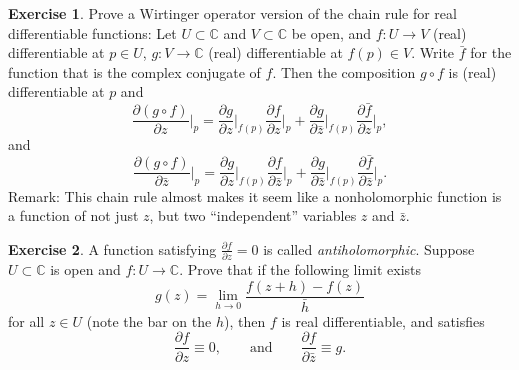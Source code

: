 \documentclass[12pt,openany]{book}
\newcommand{\C}{{\mathbb{C}}}
\newcommand{\myindex}[1]{#1\index{#1}}
\newcommand{\myquote}[1]{``#1''}
\theoremstyle{plain}
\theoremstyle{remark}
\theoremstyle{definition}
\newenvironment{exbox}{%
    \def\FrameCommand{\vrule width 1pt \relax\hspace{10pt}}%
    \MakeFramed{\advance\hsize-\width\FrameRestore}%
}{%
    \endMakeFramed
}
\theoremstyle{exercise}
\newtheorem{exercise}{Exercise}[section]
\theoremstyle{example}
\begin{document}
\begin{exbox}
\begin{exercise}%
\label{exercise:wirtingerchain}
Prove a Wirtinger operator version of
the chain rule
for real differentiable
functions:  Let $U \subset \C$ and $V \subset \C$ be open, and $f \colon U \to V$
(real) differentiable at $p \in U$, $g \colon V \to \C$ (real) differentiable
at $f(p) \in V$.  Write $\bar{f}$ for the function that is the complex conjugate
of $f$.  Then the composition $g \circ f$
is (real) differentiable at $p$ and
\begin{equation*}
\frac{\partial (g \circ f)}{\partial z}\Big|_p
=
\frac{\partial g}{\partial z}\Big|_{f(p)}
\frac{\partial f}{\partial z}\Big|_p
+
\frac{\partial g}{\partial \bar{z}}\Big|_{f(p)}
\frac{\partial \bar{f}}{\partial z}\Big|_p ,
\end{equation*}
and
\begin{equation*}
\frac{\partial (g \circ f)}{\partial \bar{z}}\Big|_p
=
\frac{\partial g}{\partial z}\Big|_{f(p)}
\frac{\partial f}{\partial \bar{z}}\Big|_p
+
\frac{\partial g}{\partial \bar{z}}\Big|_{f(p)}
\frac{\partial \bar{f}}{\partial \bar{z}}\Big|_p .
\end{equation*}
Remark: This chain rule almost makes it seem like a nonholomorphic function is a
function of not just $z$, but two \myquote{independent} variables $z$ and
$\bar{z}$.
\end{exercise}

\begin{exercise}
A function satisfying $\frac{\partial f}{\partial z} = 0$ is called
\emph{\myindex{antiholomorphic}}.
Suppose $U \subset \C$ is open and $f \colon U \to \C$.
Prove that if the following
limit exists
\begin{equation*}
g(z) = 
\lim_{h \to 0}
\frac{f(z+h)-f(z)}{\bar{h}}
\end{equation*}
for all $z \in U$ (note the bar on the $h$), then $f$ is real differentiable, and satisfies
\begin{equation*}
\frac{\partial f}{\partial z} \equiv 0, \qquad \text{and} \qquad
\frac{\partial f}{\partial \bar{z}} \equiv g .
\end{equation*}
\end{exercise}


\end{exbox}
\end{document}

